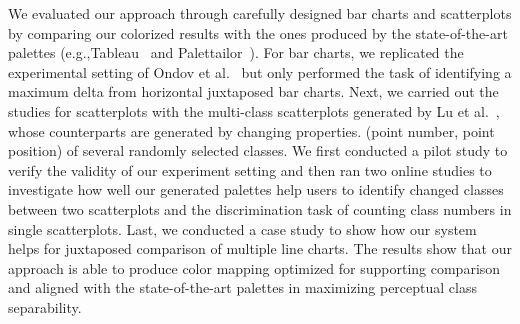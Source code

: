
We evaluated our approach through carefully designed bar charts and scatterplots by comparing our colorized results with the ones produced by the state-of-the-art palettes (e.g.,Tableau~\cite{tableau} and Palettailor~\cite{Lu21}). For bar charts, we replicated the experimental setting of Ondov et al.~\cite{Ondov19} but only performed the task of identifying a maximum delta from horizontal juxtaposed bar charts.
Next, we carried out the studies for scatterplots with the multi-class scatterplots generated by Lu et al.~\cite{Lu21}, whose counterparts are generated by changing properties. (point number, point position) of several randomly selected classes.
We first conducted a pilot study to verify the validity of our experiment setting and then ran two online studies to investigate how well our generated palettes help users to identify changed classes between two scatterplots and the discrimination task of counting class numbers in single scatterplots.
Last, we conducted a case study to show how our system helps for juxtaposed comparison of multiple line charts.
The results show that our approach is able to produce color mapping optimized for supporting comparison and aligned with the state-of-the-art palettes in maximizing perceptual class separability.

